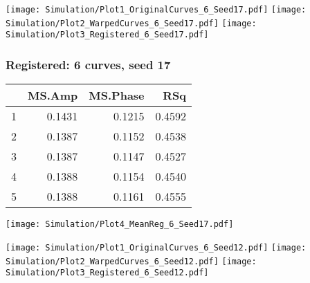 \documentclass[10pt,dvipsnames,table]{beamer}
\begin{document}
\begin{frame}
\begin{center}
\texttt{[image: Simulation/Plot1\_OriginalCurves\_6\_Seed17.pdf]} 
\texttt{[image: Simulation/Plot2\_WarpedCurves\_6\_Seed17.pdf]} 
\newline
\texttt{[image: Simulation/Plot3\_Registered\_6\_Seed17.pdf]} 
\end{center}
\end{frame}

\begin{frame}
\frametitle{Registered: 6 curves, seed 17}
\begin{table}[ht]
\footnotesize
\centering
\begin{tabular}{rrrr}
  \hline
 & MS.Amp & MS.Phase & RSq \\ 
  \hline
1 & 0.1431 & 0.1215 & 0.4592 \\ 
  2 & 0.1387 & 0.1152 & 0.4538 \\ 
  3 & 0.1387 & 0.1147 & 0.4527 \\ 
  4 & 0.1388 & 0.1154 & 0.4540 \\ 
  5 & 0.1388 & 0.1161 & 0.4555 \\ 
   \hline
\end{tabular}
\end{table}

\begin{center}
\texttt{[image: Simulation/Plot4\_MeanReg\_6\_Seed17.pdf]} 
\end{center}
\end{frame}

\begin{frame}
\begin{center}
\texttt{[image: Simulation/Plot1\_OriginalCurves\_6\_Seed12.pdf]} 
\texttt{[image: Simulation/Plot2\_WarpedCurves\_6\_Seed12.pdf]} 
\newline
\texttt{[image: Simulation/Plot3\_Registered\_6\_Seed12.pdf]} 
\end{center}
\end{frame}
\end{document}
